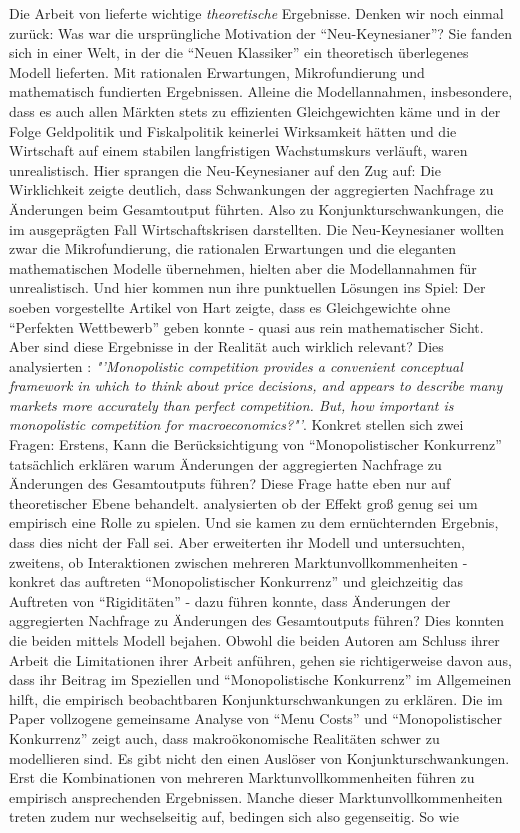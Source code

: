 Die Arbeit von \textcite{Hart1982} lieferte wichtige \textit{theoretische} Ergebnisse. Denken wir noch einmal zurück: Was war die ursprüngliche Motivation der "`Neu-Keynesianer"'? Sie fanden sich in einer Welt, in der die "`Neuen Klassiker"' ein theoretisch überlegenes Modell lieferten. Mit rationalen Erwartungen, Mikrofundierung und mathematisch fundierten Ergebnissen. Alleine die Modellannahmen, insbesondere, dass es auch allen Märkten stets zu effizienten Gleichgewichten käme und in der Folge Geldpolitik und Fiskalpolitik keinerlei Wirksamkeit hätten und die Wirtschaft auf einem stabilen langfristigen Wachstumskurs verläuft, waren unrealistisch. Hier sprangen die Neu-Keynesianer auf den Zug auf: Die Wirklichkeit zeigte deutlich, dass Schwankungen der aggregierten Nachfrage zu Änderungen beim Gesamtoutput führten. Also zu Konjunkturschwankungen, die im ausgeprägten Fall Wirtschaftskrisen darstellten. Die Neu-Keynesianer wollten zwar die Mikrofundierung, die rationalen Erwartungen und die eleganten mathematischen Modelle übernehmen, hielten aber die Modellannahmen für unrealistisch. Und hier kommen nun ihre punktuellen Lösungen ins Spiel: Der soeben vorgestellte Artikel von Hart zeigte, dass es Gleichgewichte ohne "`Perfekten Wettbewerb"' geben konnte - quasi aus rein mathematischer Sicht. Aber sind diese Ergebnisse in der Realität auch wirklich relevant? Dies analysierten \textcite[S. 647]{Blanchard1987}: \textit{"'Monopolistic competition provides a convenient conceptual framework in which to think about price decisions, and appears to describe many markets more accurately than perfect competition. But, how important is monopolistic competition for macroeconomics?"'}. Konkret stellen sich zwei Fragen: Erstens, Kann die Berücksichtigung von "`Monopolistischer Konkurrenz"' tatsächlich erklären warum Änderungen der aggregierten Nachfrage zu Änderungen des Gesamtoutputs führen? Diese Frage hatte \textcite{Hart1982} eben nur auf theoretischer Ebene behandelt. \textcite{Blanchard1987} analysierten ob der Effekt groß genug sei um empirisch eine Rolle zu spielen. Und sie kamen zu dem ernüchternden Ergebnis, dass dies nicht der Fall sei. Aber \textcite{Blanchard1987} erweiterten ihr Modell und untersuchten, zweitens, ob Interaktionen zwischen mehreren Marktunvollkommenheiten - konkret das auftreten "`Monopolistischer Konkurrenz"' und gleichzeitig das Auftreten von "`Rigiditäten"' -  dazu führen konnte, dass Änderungen der aggregierten Nachfrage zu Änderungen des Gesamtoutputs führen? Dies konnten die beiden mittels Modell bejahen. Obwohl die beiden Autoren am Schluss ihrer Arbeit \parencite[S. 663]{Blanchard1987} die Limitationen ihrer Arbeit anführen, gehen sie richtigerweise davon aus, dass ihr Beitrag im Speziellen und "`Monopolistische Konkurrenz"' im Allgemeinen hilft, die empirisch beobachtbaren Konjunkturschwankungen zu erklären. Die im Paper vollzogene gemeinsame Analyse von "`Menu Costs"' und "`Monopolistischer Konkurrenz"' zeigt auch, dass makroökonomische Realitäten schwer zu modellieren sind. Es gibt nicht den einen Auslöser von Konjunkturschwankungen. Erst die Kombinationen von mehreren Marktunvollkommenheiten führen zu empirisch ansprechenden Ergebnissen. Manche dieser Marktunvollkommenheiten treten zudem nur wechselseitig auf, bedingen sich also gegenseitig. So wie 